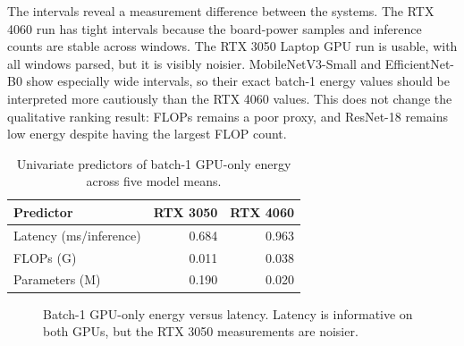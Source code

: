 \documentclass[conference]{IEEEtran}
\begin{document}
The intervals reveal a measurement difference between the systems. The RTX
4060 run has tight intervals because the board-power samples and inference
counts are stable across windows. The RTX 3050 Laptop GPU run is usable, with
all windows parsed, but it is visibly noisier. MobileNetV3-Small and
EfficientNet-B0 show especially wide intervals, so their exact batch-1 energy
values should be interpreted more cautiously than the RTX 4060 values. This
does not change the qualitative ranking result: FLOPs remains a poor proxy,
and ResNet-18 remains low energy despite having the largest FLOP count.

\begin{table}[t]
\centering
\caption{Univariate predictors of batch-1 GPU-only energy across five model
means.}
\label{tab:predictors}
\small
\begin{tabular}{lrr}
\toprule
Predictor & RTX 3050 & RTX 4060\\
\midrule
Latency (ms/inference) & 0.684 & 0.963\\
FLOPs (G) & 0.011 & 0.038\\
Parameters (M) & 0.190 & 0.020\\
\bottomrule
\end{tabular}
\end{table}

\begin{figure}[t]
\centering
{}
\caption{Batch-1 GPU-only energy versus latency. Latency is informative on
both GPUs, but the RTX 3050 measurements are noisier.}
\label{fig:energy-latency}
\end{figure}
\end{document}
